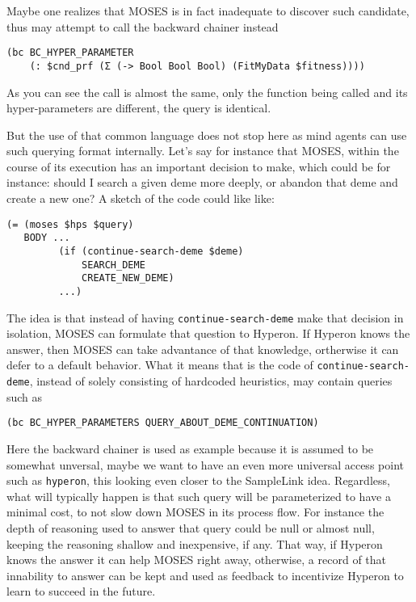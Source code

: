 \documentclass[]{report}
\begin{document}
Maybe one realizes that MOSES is in fact inadequate to discover such
candidate, thus may attempt to call the backward chainer instead

\begin{verbatim}
(bc BC_HYPER_PARAMETER
    (: $cnd_prf (Σ (-> Bool Bool Bool) (FitMyData $fitness))))
\end{verbatim}
As you can see the call is almost the same, only the function being
called and its hyper-parameters are different, the query is identical.

But the use of that common language does not stop here as mind agents
can use such querying format internally.  Let's say for instance that
MOSES, within the course of its execution has an important decision to
make, which could be for instance: should I search a given deme more
deeply, or abandon that deme and create a new one?  A sketch of the
code could like like:

\begin{verbatim}
(= (moses $hps $query)
   BODY ...
         (if (continue-search-deme $deme)
             SEARCH_DEME
             CREATE_NEW_DEME)
         ...)
\end{verbatim}
The idea is that instead of having \texttt{continue-search-deme} make
that decision in isolation, MOSES can formulate that question to
Hyperon.  If Hyperon knows the answer, then MOSES can take advantance
of that knowledge, ortherwise it can defer to a default behavior.
What it means that is the code of \texttt{continue-search-deme},
instead of solely consisting of hardcoded heuristics, may contain
queries such as

\begin{verbatim}
(bc BC_HYPER_PARAMETERS QUERY_ABOUT_DEME_CONTINUATION)
\end{verbatim}
Here the backward chainer is used as example because it is assumed to
be somewhat unversal, maybe we want to have an even more universal
access point such as \texttt{hyperon}, this looking even closer to the
SampleLink idea.  Regardless, what will typically happen is that
such query will be parameterized to have a minimal cost, to not slow
down MOSES in its process flow.  For instance the depth of reasoning
used to answer that query could be null or almost null, keeping the
reasoning shallow and inexpensive, if any.  That way, if Hyperon knows
the answer it can help MOSES right away, otherwise, a record of that
innability to answer can be kept and used as feedback to incentivize
Hyperon to learn to succeed in the future.
\end{document}
